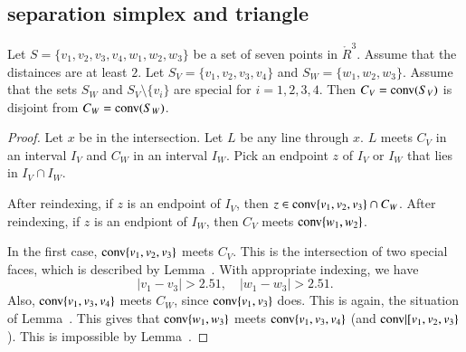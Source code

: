 \begin{tarskidata}
\begin{tarski}
\subsection{separation simplex and triangle}

\begin{lemma}
Let $S=\{v_1,v_2,v_3,v_4,w_1,w_2,w_3\}$ be a set of seven points
in $\ring{R}^3$.  Assume that the distainces are at least $2$.
Let $S_V = \{v_1,v_2,v_3,v_4\}$ and $S_W=\{w_1,w_2,w_3\}$.  Assume
that the sets $S_W$ and $S_V\setminus\{v_i\}$ are special for
$i=1,2,3,4$.
Then $C_V={\operatorname{conv}}(S_V)$ is disjoint from $C_W={\operatorname{conv}}(S_W)$.
\end{lemma}

\begin{proof}  Let $x$ be in the intersection.
Let $L$ be any line through $x$.  $L$ meets $C_V$ in an interval
$I_V$ and $C_W$ in an interval $I_W$.  Pick an endpoint $z$
of $I_V$ or $I_W$ that lies in $I_V\cap I_W$.  

After reindexing, if $z$ is an endpoint of $I_V$, then
$z\in{\operatorname{conv}}\{v_1,v_2,v_3\}\cap C_W$.  After reindexing, if $z$
is an endpiont of $I_W$, then $C_V$ meets ${\operatorname{conv}}\{w_1,w_2\}$.

In the first case, ${\operatorname{conv}}\{v_1,v_2,v_3\}$ meets $C_V$.
This is the intersection of two special faces, which is described
by Lemma~.  With appropriate indexing, we have
$$
  |v_1-v_3|>2.51,\quad |w_1-w_3|>2.51.
$$
Also, ${\operatorname{conv}}\{v_1,v_3,v_4\}$ meets $C_W$, since ${\operatorname{conv}}\{v_1,v_3\}$
does.  This is again, the situation of Lemma~.
This gives that ${\operatorname{conv}}\{w_1,w_3\}$ meets ${\operatorname{conv}}\{v_1,v_3,v_4\}$
(and ${\operatorname{conv}}|[v_1,v_2,v_3\}$).  This is impossible by 
Lemma~.
\end{proof}
\end{tarski}





\begin{tarski}


\end{tarski}
\end{tarskidata}
